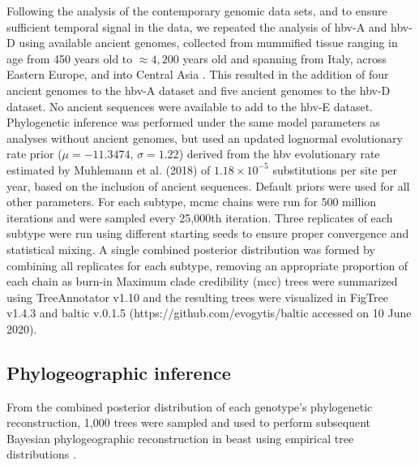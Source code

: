 Following the analysis of the contemporary genomic data sets, and to ensure sufficient temporal signal in the data, we repeated the analysis of \gls{hbv}-A and \gls{hbv}-D using available ancient genomes, collected from mummified tissue ranging in age from 450 years old to $\approx4,200$ years old and spanning from Italy, across Eastern Europe, and into Central Asia \citep{ross2018paradox,muhlemann_ancient_2018}.
This resulted in the addition of four ancient genomes to the \gls{hbv}-A dataset and five ancient genomes to the \gls{hbv}-D dataset.
No ancient sequences were available to add to the \gls{hbv}-E dataset.
Phylogenetic inference was performed under the same model parameters as analyses without ancient genomes, but used an updated lognormal evolutionary rate prior ($\mu=-11.3474$, $\sigma=1.22$) derived from the \gls{hbv} evolutionary rate estimated by Muhlemann et al. (2018) of $1.18 \times 10^{-5}$ substitutions per site per year, based on the inclusion of ancient sequences.
Default priors were used for all other parameters.
For each subtype, \gls{mcmc} chains were run for 500 million iterations and were sampled every 25,000th iteration.
Three replicates of each subtype were run using different starting seeds to ensure proper convergence and statistical mixing.
A single combined posterior distribution was formed by combining all replicates for each subtype, removing an appropriate proportion of each chain as burn-in
Maximum clade credibility (\gls{mcc}) trees were summarized using TreeAnnotator v1.10 \citep{suchard_bayesian_2018} and the resulting trees were visualized in FigTree v1.4.3 and baltic v.0.1.5 (https://github.com/evogytis/baltic accessed on 10 June 2020).

\subsection{Phylogeographic inference}
From the combined posterior distribution of each genotype's phylogenetic reconstruction, 1,000 trees were sampled and used to perform subsequent Bayesian phylogeographic reconstruction in \gls{beast} using empirical tree distributions \citep{pagel_bayesian_2004}.\\


